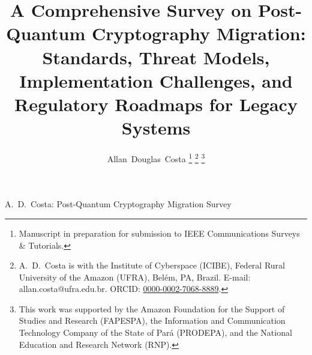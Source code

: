 \documentclass[journal]{IEEEtran}
\begin{document}

\title{A Comprehensive Survey on Post-Quantum Cryptography Migration:\\
Standards, Threat Models, Implementation Challenges, and\\
Regulatory Roadmaps for Legacy Systems}

\author{Allan~Douglas~Costa%
\thanks{Manuscript in preparation for submission to IEEE Communications Surveys \& Tutorials.}%
\thanks{A.~D.~Costa is with the Institute of Cyberspace (ICIBE),
Federal Rural University of the Amazon (UFRA), Bel\'{e}m, PA, Brazil.
E-mail: allan.costa@ufra.edu.br.
ORCID: \href{https://orcid.org/0000-0002-7068-8889}{0000-0002-7068-8889}.}%
\thanks{This work was supported by the Amazon Foundation for the
Support of Studies and Research (FAPESPA), the Information and
Communication Technology Company of the State of Par\'{a} (PRODEPA),
and the National Education and Research Network (RNP).}%
}

%
{A.~D.~Costa: Post-Quantum Cryptography Migration Survey}

\maketitle
\end{document}
